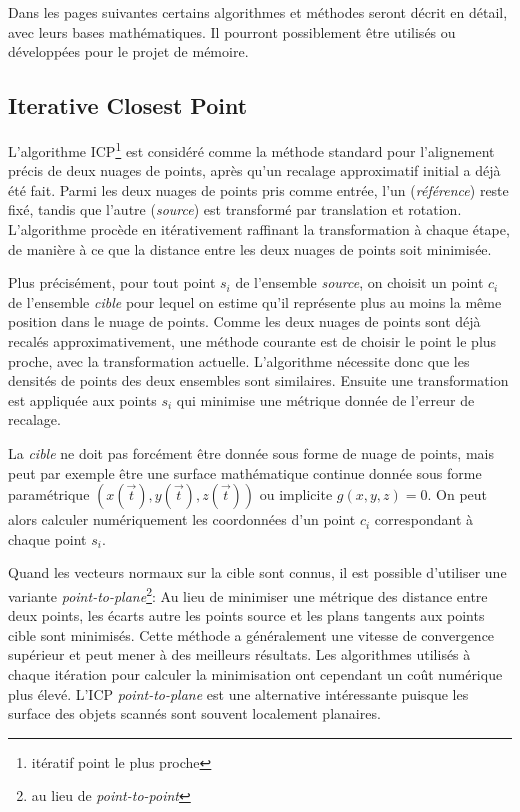 \documentclass[a4paper,10pt]{scrreprt}
\begin{document}
Dans les pages suivantes certains algorithmes et méthodes seront décrit en détail, avec leurs bases mathématiques. Il pourront possiblement être utilisés ou développées pour le projet de mémoire.



\subsection{Iterative Closest Point}
L'algorithme ICP\footnote{itératif point le plus proche} est considéré comme la méthode standard pour l'alignement précis de deux nuages de points, après qu'un recalage approximatif initial a déjà été fait. Parmi les deux nuages de points pris comme entrée, l'un (\emph{référence}) reste fixé, tandis que l'autre (\emph{source}) est transformé par translation et rotation. L'algorithme procède en itérativement raffinant la transformation à chaque étape, de manière à ce que la distance entre les deux nuages de points soit minimisée.

Plus précisément, pour tout point $s_i$ de l'ensemble \emph{source}, on choisit un point $c_i$ de l'ensemble \emph{cible} pour lequel on estime qu'il représente plus au moins la même position dans le nuage de points. Comme les deux nuages de points sont déjà recalés approximativement, une méthode courante est de choisir le point le plus proche, avec la transformation actuelle. L'algorithme nécessite donc que les densités de points des deux ensembles sont similaires. Ensuite une transformation est appliquée aux points $s_i$ qui minimise une métrique donnée de l'erreur de recalage.

La \emph{cible} ne doit pas forcément être donnée sous forme de nuage de points, mais peut par exemple être une surface mathématique continue donnée sous forme paramétrique $(x(\vec{t}),y(\vec{t}),z(\vec{t}))$ ou implicite $g(x, y, z) = 0$. On peut alors calculer numériquement les coordonnées d'un point $c_i$ correspondant à chaque point $s_i$. \cite{Besl1992}

Quand les vecteurs normaux sur la cible sont connus, il est possible d'utiliser une variante \emph{point-to-plane}\footnote{au lieu de \emph{point-to-point}}: Au lieu de minimiser une métrique des distance entre deux points, les écarts autre les points source et les plans tangents aux points cible sont minimisés. Cette méthode a généralement une vitesse de convergence supérieur et peut mener à des meilleurs résultats. Les algorithmes utilisés à chaque itération pour calculer la minimisation ont cependant un coût numérique plus élevé. L'ICP \emph{point-to-plane} est une alternative intéressante puisque les surface des objets scannés sont souvent localement planaires. \cite{Low2004}
\end{document}
